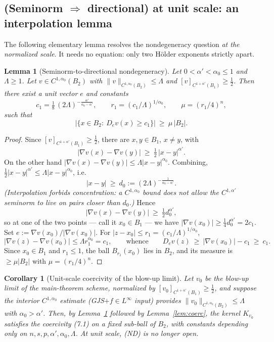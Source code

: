 \documentclass[11pt]{amsart}
\theoremstyle{plain}
\newtheorem{lemma}[theorem]{Lemma}
\newtheorem{corollary}[theorem]{Corollary}
\theoremstyle{definition}
\theoremstyle{remark}
\newcommand{\al}{\alpha}
\begin{document}
\subsection{(Seminorm $\Rightarrow$ directional) at unit scale: an
interpolation lemma}\label{sec:interp}
The following elementary lemma resolves the nondegeneracy question \emph{at the
normalized scale}. It needs no equation: only two H\"older exponents strictly
apart.

\begin{lemma}[Seminorm-to-directional nondegeneracy]\label{lem:interp}
Let $0<\al'<\al_0\le1$ and $\Lambda\ge1$. Let $v\in C^{1,\al_0}(B_2)$ with
$\|v\|_{C^{1,\al_0}(B_2)}\le\Lambda$ and $[v]_{C^{1+\al'}(B_1)}\ge\tfrac12$.
Then there exist a unit vector $e$ and constants
\[
  c_1=\tfrac18\,(2\Lambda)^{-\frac{\al'}{\al_0-\al'}},\qquad
  r_1=(c_1/\Lambda)^{1/\al_0},\qquad \mu=(r_1/4)^n,
\]
such that
\[
  \big|\{x\in B_2:\ D_e v(x)\ge c_1\}\big|\ \ge\ \mu\,|B_2| .
\]
\end{lemma}

\begin{proof}
Since $[v]_{C^{1+\al'}(B_1)}\ge\frac12$, there are $x,y\in B_1$, $x\neq y$, with
\[
  |\nabla v(x)-\nabla v(y)|\ \ge\ \tfrac12\,|x-y|^{\al'} .
\]
On the other hand $|\nabla v(x)-\nabla v(y)|\le\Lambda|x-y|^{\al_0}$. Combining,
$\tfrac12|x-y|^{\al'}\le\Lambda|x-y|^{\al_0}$, i.e.
\[
  |x-y|\ \ge\ d_0:=(2\Lambda)^{-\frac{1}{\al_0-\al'}} .
\]
\emph{(Interpolation forbids concentration: a $C^{1,\al_0}$ bound does not allow
the $C^{1,\al'}$ seminorm to live on pairs closer than $d_0$.)} Hence
\[
  |\nabla v(x)-\nabla v(y)|\ \ge\ \tfrac12 d_0^{\al'},
\]
so at one of the two points --- call it $x_0\in B_1$ --- we have
$|\nabla v(x_0)|\ge\tfrac14 d_0^{\al'}=2c_1$. Set
$e:=\nabla v(x_0)/|\nabla v(x_0)|$. For $|z-x_0|\le r_1=(c_1/\Lambda)^{1/\al_0}$,
\[
  |\nabla v(z)-\nabla v(x_0)|\le\Lambda r_1^{\al_0}=c_1,
  \qquad\text{whence}\qquad
  D_ev(z)\ \ge\ |\nabla v(x_0)|-c_1\ \ge\ c_1 .
\]
Since $x_0\in B_1$ and $r_1\le1$, the ball $B_{r_1}(x_0)$ lies in $B_2$, and its
measure is $\ge\mu|B_2|$ with $\mu=(r_1/4)^n$.
\end{proof}

\begin{corollary}[Unit-scale coercivity of the blow-up limit]\label{cor:unitcoerc}
Let $v_0$ be the blow-up limit of the main-theorem scheme, normalized by
$[v_0]_{C^{1+\al'}(B_1)}\ge\frac12$, and suppose the interior
$C^{1,\al_0}$ estimate (\textnormal{GJS}$+f\in L^\infty$ input) provides
$\|v_0\|_{C^{1,\al_0}(B_2)}\le\Lambda$ with $\al_0>\al'$. Then, by
Lemma~\ref{lem:interp} followed by Lemma~\ref{lem:coerc}, the kernel $K_{v_0}$
satisfies the coercivity \textnormal{(7.1)} on a fixed sub-ball of $B_2$, with
constants depending only on $n,s,p,\al',\al_0,\Lambda$. \emph{At unit scale,
\textnormal{(ND)} is no longer open.}
\end{corollary}
\end{document}
